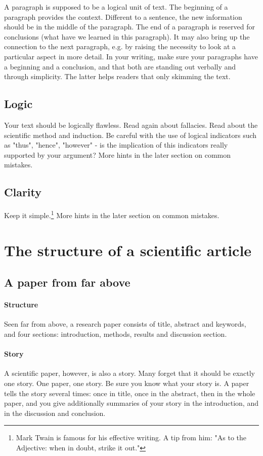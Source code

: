 \documentclass{tufte-book}
\begin{document}
A paragraph is supposed to be a logical unit of text. The beginning of a paragraph provides the context. Different to a sentence, the new information should be in the middle of the paragraph. The end of a paragraph is reserved for conclusions (what have we learned in this paragraph). It may also bring up the connection to the next paragraph, e.g. by raising the necessity to look at a particular aspect in more detail. In your writing, make sure your paragraphs have a beginning and a conclusion, and that both are standing out verbally and through simplicity. The latter helps readers that only skimming the text.

\subsection{Logic}

Your text should be logically flawless. Read again about fallacies. Read about the scientific method and induction. Be careful with the use of logical indicators such as "thus", "hence", "however" - is the implication of this indicators really supported by your argument? More hints in the later section on common mistakes.

\subsection{Clarity}

Keep it simple.\footnote{Mark Twain is famous for his effective writing. A tip from him: "As to the Adjective: when in doubt, strike it out."} More hints in the later section on common mistakes.

\section{The structure of a scientific article}

\subsection{A paper from far above}

\paragraph{Structure}Seen far from above, a research paper consists of title, abstract and keywords, and four sections: introduction, methods, results and discussion section.

\paragraph{Story}A scientific paper, however, is also a story. Many forget that it should be exactly one story. One paper, one story. Be sure you know what your story is. A paper tells the story several times: once in title, once in the abstract, then in the whole paper, and you give additionally summaries of your story in the introduction, and in the discussion and  conclusion.
\end{document}
